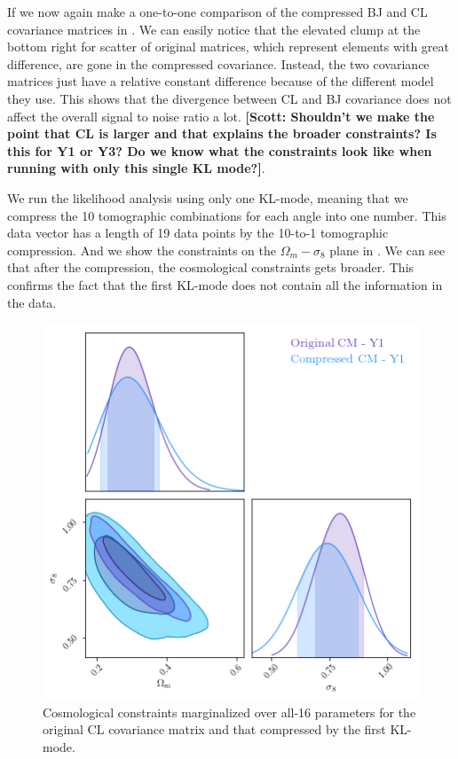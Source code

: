 \documentclass[twocolumn]{\docclass}
\newcommand\scott[1]{{\bf [Scott: #1]}}
\begin{document}
	If we now again make a one-to-one comparison of the compressed BJ and CL covariance matrices in . We can easily notice that the elevated clump at the bottom right for scatter of original matrices, which represent elements with great difference, are gone in the compressed covariance. Instead, the two covariance matrices just have a relative constant difference because of the different model they use. This shows that the divergence between CL and BJ covariance does not affect the overall signal to noise ratio a lot. \scott{Shouldn't we make the point that CL is larger and that explains the broader constraints? Is this for Y1 or Y3? Do we know what the constraints look like when running with only this single KL mode?}.
	
	We run the likelihood analysis using only one KL-mode, meaning that we compress the 10 tomographic combinations for each angle into one number.  This data vector has a length of 19 data points by the 10-to-1 tomographic compression. And we show the constraints on the $\Omega_m - \sigma_8$ plane in . We can see that after the compression, the cosmological constraints gets broader. This confirms the fact that the first KL-mode does not contain all the information in the data.
	
	\begin{figure}
		\includegraphics[width=0.8\columnwidth]{kl_constraint1.png}
		\caption{ Cosmological constraints marginalized over all-16 parameters for the original CL covariance matrix and that compressed by the first KL-mode.\label{fig:kl-constaints}}
	\end{figure}
	
\end{document}
